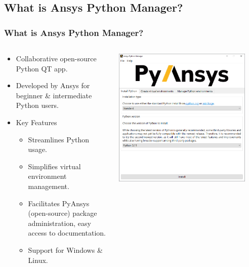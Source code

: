 \documentclass[t]{beamer}
\begin{document}
	\subsection{What is Ansys Python Manager?}
	\begin{frame}
		\frametitle{What is Ansys Python Manager?}
		\vspace{-9pt}
		\begin{center}
			\begin{columns}[T]
				\begin{column}{.5\textwidth}
					\vspace{20pt} %
					\small
					\begin{itemize}
						\item Collaborative open-source Python QT app.
						\item Developed by Ansys for beginner \& intermediate Python users.\\
						\vspace{5pt}
						\item Key Features
						\begin{itemize}
							\item Streamlines Python usage.
							\item Simplifies virtual environment management.
							\item Facilitates PyAnsys (open-source) package administration, easy access to documentation.
							\item Support for Windows \& Linux.
						\end{itemize}
					\end{itemize}
					\vspace{2pt}
				\end{column}
				\begin{column}{.5\textwidth}
					\centering
					\includegraphics[width=0.9\textwidth]{assets/ansys_python_manager_screen_1.png}
				\end{column}
			\end{columns}
		\end{center}
		

\end{frame}
\end{document}
